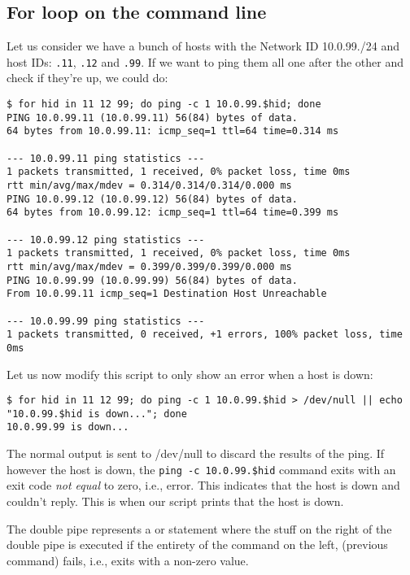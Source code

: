 \subsection{For loop on the command line}
Let us consider we have a bunch of hosts with the Network ID 10.0.99./24 and host IDs: \verb|.11|, \verb|.12| and \verb|.99|. If we want to ping them all one after the other and check if they're up, we could do:

\vspace{-15pt}
\begin{verbatim}
$ for hid in 11 12 99; do ping -c 1 10.0.99.$hid; done
PING 10.0.99.11 (10.0.99.11) 56(84) bytes of data.
64 bytes from 10.0.99.11: icmp_seq=1 ttl=64 time=0.314 ms

--- 10.0.99.11 ping statistics ---
1 packets transmitted, 1 received, 0% packet loss, time 0ms
rtt min/avg/max/mdev = 0.314/0.314/0.314/0.000 ms
PING 10.0.99.12 (10.0.99.12) 56(84) bytes of data.
64 bytes from 10.0.99.12: icmp_seq=1 ttl=64 time=0.399 ms

--- 10.0.99.12 ping statistics ---
1 packets transmitted, 1 received, 0% packet loss, time 0ms
rtt min/avg/max/mdev = 0.399/0.399/0.399/0.000 ms
PING 10.0.99.99 (10.0.99.99) 56(84) bytes of data.
From 10.0.99.11 icmp_seq=1 Destination Host Unreachable

--- 10.0.99.99 ping statistics ---
1 packets transmitted, 0 received, +1 errors, 100% packet loss, time 0ms
\end{verbatim}
\vspace{-10pt}	

\noindent
Let us now modify this script to only show an error when a host is down:

\vspace{-15pt}
\begin{verbatim}
$ for hid in 11 12 99; do ping -c 1 10.0.99.$hid > /dev/null || echo "10.0.99.$hid is down..."; done
10.0.99.99 is down...
\end{verbatim}
\vspace{-10pt}	

\noindent
The normal output is sent to /dev/null to discard the results of the ping. If however the host is down, the \verb|ping -c 10.0.99.$hid| command exits with an exit code \textit{not equal} to zero, i.e., error. This indicates that the host is down and couldn't reply. This is when our script prints that the host is down. 

The double pipe represents a or statement where the stuff on the right of the double pipe is executed if the entirety of the command on the left, (previous command) fails, i.e., exits with a non-zero value. 

